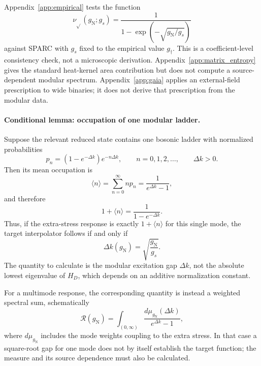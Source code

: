 Appendix~\ref{app:empirical} tests the function
\[
\nu_{\sqrt{}}(g_{\mathrm N};g_s)
=
\frac{1}{1-\exp\!\left(-\sqrt{g_{\mathrm N}/g_s}\right)}
\]
against SPARC with \(g_s\) fixed to the empirical value
\(g_\dagger\). This is a coefficient-level consistency check, not
a microscopic derivation. Appendix~\ref{app:matrix_entropy} gives
the standard heat-kernel area contribution but does not compute a
source-dependent modular spectrum. Appendix~\ref{app:gaia} applies
an external-field prescription to wide binaries; it does not derive
that prescription from the modular data.

\paragraph{Conditional lemma: occupation of one modular ladder.}
Suppose the relevant reduced state contains one bosonic ladder with
normalized probabilities
\[
p_n=(1-e^{-\Delta k})e^{-n\Delta k},
\qquad n=0,1,2,\ldots,\qquad \Delta k>0.
\]
Then its mean occupation is
\[
\langle n\rangle
=
\sum_{n=0}^{\infty} n p_n
=
\frac{1}{e^{\Delta k}-1},
\]
and therefore
\[
1+\langle n\rangle
=
\frac{1}{1-e^{-\Delta k}}.
\]
Thus, if the extra-stress response is exactly \(1+\langle n\rangle\)
for this single mode, the target interpolator follows if and only if
\[
\Delta k(g_{\mathrm N})
=
\sqrt{\frac{g_{\mathrm N}}{g_s}}.
\]
The quantity to calculate is the modular excitation gap
\(\Delta k\), not the absolute lowest eigenvalue of \(H_D\), which
depends on an additive normalization constant.

For a multimode response, the corresponding quantity is instead a
weighted spectral sum, schematically
\[
\mathcal R(g_{\mathrm N})
=
\int_{(0,\infty)}
\frac{d\mu_{g_{\mathrm N}}(\Delta k)}
     {e^{\Delta k}-1},
\]
where \(d\mu_{g_{\mathrm N}}\) includes the mode weights coupling
to the extra stress. In that case a square-root gap for one mode
does not by itself establish the target function; the measure and
its source dependence must also be calculated.

